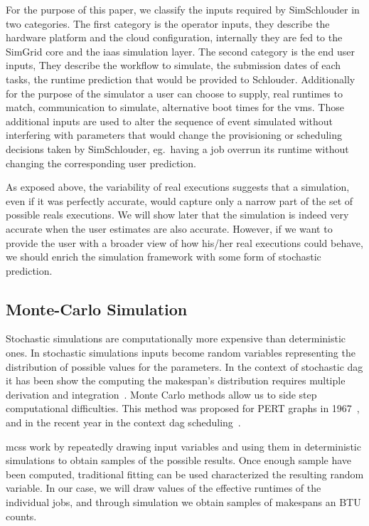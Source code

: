 \documentclass[10pt,conference,compsocconf]{IEEEtran}
\begin{document}
For the purpose of this paper, we classify the inputs required by SimSchlouder
in two categories. The first category is the operator inputs, they describe the
hardware platform and the cloud configuration, internally they are fed to the
SimGrid core and the \ac{iaas} simulation layer. The second category is
the end user inputs, They describe the workflow to simulate, the submission
dates of each tasks, the runtime prediction that would be provided to Schlouder.
Additionally for the purpose of the simulator a user can choose to supply, real
runtimes to match, communication to simulate, alternative boot times for the
\acp{vm}. Those additional inputs are used to alter the sequence of event
simulated without interfering with parameters that would change the provisioning
or scheduling decisions taken by SimSchlouder, eg.\ having a job overrun its
runtime without changing the corresponding user prediction.

As exposed above, the variability of real executions suggests that a simulation,
even if it was  perfectly accurate, would capture only a narrow  part of the set
of possible reals  executions. We will show later that  the simulation is indeed
very accurate when the user estimates are also accurate. However, if we want to
provide  the user  with a  broader  view of  how his/her  real executions  could
behave, we should  enrich the simulation framework with some  form of stochastic
prediction.

\subsection{Monte-Carlo Simulation}

Stochastic simulations are computationally more expensive than deterministic
ones. In stochastic simulations inputs become random variables representing the
distribution of possible values for the parameters. In the context of stochastic
\ac{dag} it has been show the computing the makespan's distribution requires
multiple derivation and integration~\cite{Ludwig01,Li97}. Monte Carlo methods
allow us to side step computational difficulties. This method was proposed for
PERT graphs in 1967~\cite{Slyke63}, and in the recent year in the context
\ac{dag} scheduling~\cite{Canon10,Zheng13}. 

\aclp{mcs} work by repeatedly drawing input variables and using them in
deterministic simulations to obtain samples of the possible results. Once
enough sample have been computed, traditional fitting can be used characterized
the resulting random variable. In our case, we will draw values of the effective
runtimes of the individual jobs, and through simulation we obtain samples of
makespans an BTU counts.
\end{document}
